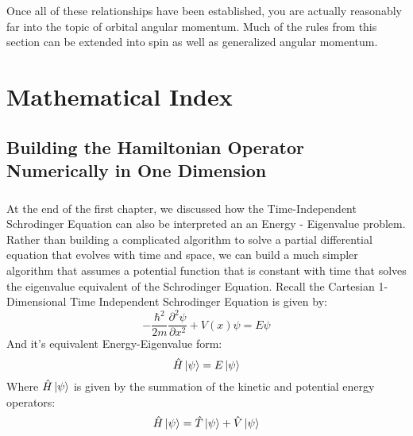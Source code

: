 \documentclass[12pt,letterpaper]{book}
\begin{document}
Once all of these relationships have been established, you are actually reasonably far into the topic of orbital angular momentum. Much of the rules from this section can be extended into spin as well as generalized angular momentum.












\chapter{Mathematical Index}



\section{Building the Hamiltonian Operator Numerically in One Dimension}

\paragraph*{}At the end of the first chapter, we discussed how the Time-Independent Schrodinger Equation can also be interpreted an an Energy - Eigenvalue problem. Rather than building a complicated algorithm to solve a partial differential equation that evolves with time and space, we can build a much simpler algorithm that assumes a potential function that is constant with time that solves the eigenvalue equivalent of the Schrodinger Equation. Recall the Cartesian 1-Dimensional Time Independent Schrodinger Equation is given by:
\begin{equation}
-\frac{\hbar^2}{2m}\frac{\partial^2 \psi}{\partial x^2} + V(x)\psi = E\psi
\end{equation}
And it's equivalent Energy-Eigenvalue form:
\begin{equation}
\hat{H}\ket{\psi} = E\ket{\psi}
\end{equation}
Where $\hat{H}\ket{\psi}$ is given by the summation of the kinetic and potential energy operators:
\begin{equation}
\hat{H}\ket{\psi} = \hat{T}\ket{\psi} + \hat{V}\ket{\psi}
\end{equation}
\end{document}
